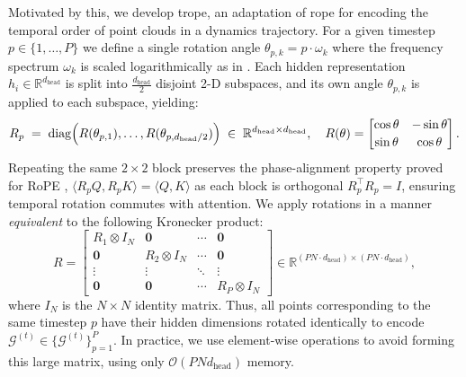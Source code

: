 Motivated by this, we develop \gls{trope}, an adaptation of \gls{rope} for encoding the temporal order of point clouds in a dynamics trajectory. For a given timestep \(p\in\{1,\dots,P\}\) we define a single rotation angle
\(\theta_{p,k} = p \cdot \omega_k\) where the frequency spectrum \(\omega_k\) is scaled logarithmically as in \cite{su_roformer_2023}. Each hidden representation \(h_i\in\mathbb{R}^{d_{\text{head}}}\)
is split into \(\frac{d_{\text{head}}}{2}\) disjoint 2-D subspaces, and its own angle \(\theta_{p,k}\) is applied to each subspace, yielding:
\begin{equation}
    R_{p}\;=\;
    \operatorname{diag}\Bigl(R(\theta_{p,1}),\dots, R(\theta_{p,d_\text{head}/2})\Bigr)
    \;\in\;
    \mathbb{R}^{d_{\text{head}}\times d_{\text{head}}},
    \quad
    R(\theta)=
    \begin{bmatrix}
        \cos\theta & -\sin\theta\\[2pt]
        \sin\theta &  \cos\theta
    \end{bmatrix}.
    \label{eq:trope_single_angle}
\end{equation}
Repeating the same \(2\times2\) block preserves the phase-alignment property
proved for RoPE \cite{su_roformer_2023}, \(\langle R_pQ, R_pK \rangle = \langle Q, K \rangle\) as each block is orthogonal \(R_p^\top R_p = I\), ensuring temporal rotation
commutes with attention. We apply rotations in a manner \emph{equivalent} to the following Kronecker product:
\begin{equation}
    R = \begin{bmatrix}
    R_1\otimes I_N & \mathbf{0} & \cdots & \mathbf{0} \\[1mm]
    \mathbf{0} & R_2\otimes I_N & \cdots & \mathbf{0} \\[1mm]
    \vdots & \vdots & \ddots & \vdots \\[1mm]
    \mathbf{0} & \mathbf{0} & \cdots & R_P\otimes I_N
    \end{bmatrix} \in \mathbb{R}^{(PN \cdot d_{\text{head}}) \times (PN \cdot d_{\text{head}})},
\end{equation}
where \( I_N \) is the \( N \times N \) identity matrix. Thus, all points corresponding to the same timestep \(p\) have their hidden dimensions rotated identically to encode \(\mathcal{G}^{(t)} \in \{\mathcal{G}^{(t)}\}^P_{p=1}\). In practice, we use element-wise operations to avoid forming this large matrix, using only \(\mathcal{O}(PNd_\text{head})\) memory.

